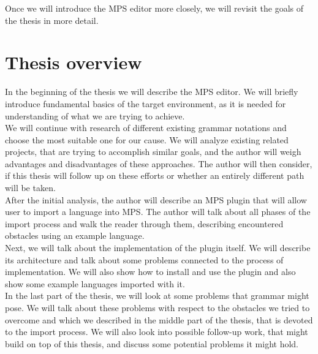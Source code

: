 Once we will introduce the MPS editor more closely, we will revisit the goals of the thesis in more detail.

\section{Thesis overview}

In the beginning of the thesis we will describe the MPS editor. We will briefly introduce fundamental basics of the target environment, as it is needed for understanding of what we are trying to achieve.
\\

We will continue with research of different existing grammar notations and choose the most suitable one for our cause. We will analyze existing related projects, that are trying to accomplish similar goals, and the author will weigh advantages and disadvantages of these approaches. The author will then consider, if this thesis will follow up on these efforts or whether an entirely different path will be taken. 
\\

After the initial analysis, the author will describe an MPS plugin that will allow user to import a language into MPS. The author will talk about all phases of the import process and walk the reader through them, describing encountered obstacles using an example language. 
\\

Next, we will talk about the implementation of the plugin itself. We will describe its architecture and talk about some problems connected to the process of implementation. We will also show how to install and use the plugin and also show some example languages imported with it.
\\

In the last part of the thesis, we will look at some problems that grammar might pose. We will talk about these problems with respect to the obstacles we tried to overcome and which we described in the middle part of the thesis, that is devoted to the import process. We will also look into possible follow-up work, that might build on top of this thesis, and discuss some potential problems it might hold.